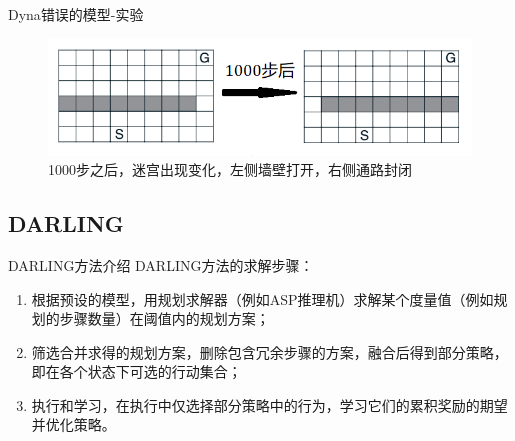\documentclass[10pt]{beamer}
\begin{document}
	\begin{frame}{Dyna}{错误的模型-实验}
		\begin{figure}
			\centering
			\includegraphics[width=0.5\linewidth]{pictures/blocking-maze}
			\caption{1000步之后，迷宫出现变化，左侧墙壁打开，右侧通路封闭}
			\label{fig:blocking-maze}
		\end{figure}
		
	\end{frame}
	
	\subsection{DARLING}
	
	\begin{frame}{DARLING}{方法介绍}
		DARLING方法\cite{Leonetti2016:AutoPlan-RL}的求解步骤：
		\begin{enumerate}
			\item<2-> 根据预设的模型，用规划求解器（例如ASP推理机）求解某个度量值（例如规划的步骤数量）在阈值内的规划方案；
			\item<3-> 筛选合并求得的规划方案，删除包含冗余步骤的方案，融合后得到部分策略，即在各个状态下可选的行动集合；
			\item<4-> 执行和学习，在执行中仅选择部分策略中的行为，学习它们的累积奖励的期望并优化策略。
		\end{enumerate}
	
	\end{frame}
\end{document}
